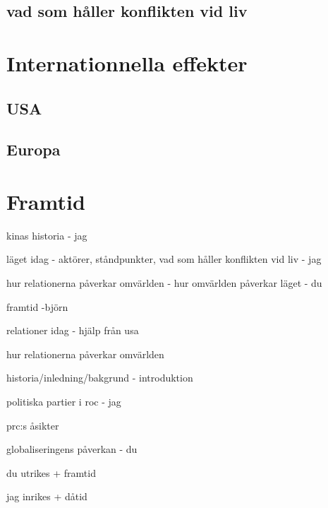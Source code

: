 \documentclass[a4paper,10pt]{article}
\begin{document}
\subsection{vad som håller konflikten vid liv}


\section{Internationnella effekter}

\subsection{USA}

\subsection{Europa}

\section{Framtid}


kinas historia - jag

läget idag - aktörer, ståndpunkter, vad som håller konflikten vid liv - jag

hur relationerna påverkar omvärlden - hur omvärlden påverkar läget - du

framtid -björn


relationer idag - hjälp från usa

hur relationerna påverkar omvärlden

historia/inledning/bakgrund - introduktion

politiska partier i roc - jag

prc:s åsikter

globaliseringens påverkan - du


du utrikes + framtid

jag inrikes + dåtid
\end{document}
